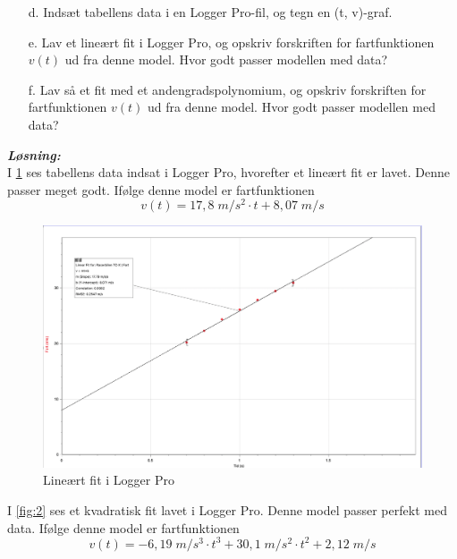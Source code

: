 \documentclass{report}
\newcommand{\sol}{\setlength{\parindent}{0cm}\textbf{\textit{Løsning:}}\setlength{\parindent}{1cm}}
\begin{document}
\begin{question}{}{}
\begin{itemize}
  \item[d.] Indsæt tabellens data i en Logger Pro-fil, og tegn en (t, v)-graf.
  \item[e.] Lav et lineært fit i Logger Pro, og opskriv forskriften for fartfunktionen $v(t)$ ud fra denne model. Hvor godt passer modellen med data?
  \item[f.] Lav så et fit med et andengradspolynomium, og opskriv forskriften for fartfunktionen $v(t)$ ud fra denne model. Hvor godt passer modellen med data?
\end{itemize}
\end{question}
\sol \\ 
I \cref{fig:1} ses tabellens data indsat i Logger Pro, hvorefter et lineært fit er lavet. Denne passer meget godt. Ifølge denne model er fartfunktionen
\[
v(t)=17,8\;\unit{m/s^2}\cdot t + 8,07\;\unit{m/s}
\] 
\begin{figure}[h]
\begin{center}
  \includegraphics[scale=0.3]{H4_1.png}
\end{center}
\caption{Lineært fit i Logger Pro}
\label{fig:1}
\end{figure}
\linebreak
I \cref{fig:2} ses et kvadratisk fit lavet i Logger Pro. Denne model passer perfekt med data. Ifølge denne model er fartfunktionen
\[
v(t)=-6,19\;\unit{m/s^3}\cdot t^3 + 30,1\;\unit{m/s^2} \cdot t^2 + 2,12\;\unit{m/s}
\] 
\end{document}

